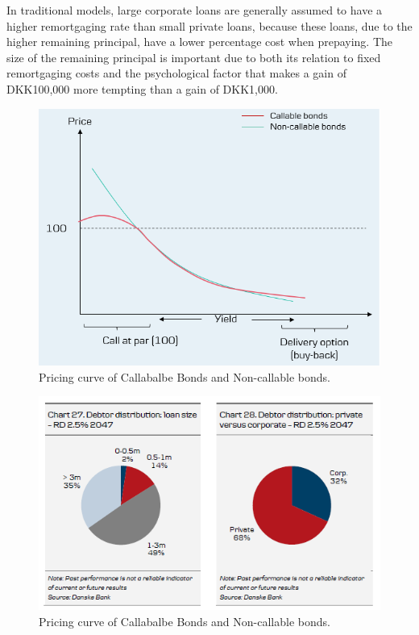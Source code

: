 \documentclass[12pt,twoside]{reedthesis}
\begin{document}
In traditional models, large corporate loans are generally assumed to have a higher remortgaging rate than small private loans, because these loans, due to the higher remaining principal, have a lower percentage cost when prepaying. The size of the remaining principal is important due to both its relation to fixed remortgaging costs and the psychological factor that makes a gain of DKK100,000 more tempting than a gain of DKK1,000.
\begin{figure}

{\centering \includegraphics[width=1\linewidth]{figure/prepay} 

}

\caption{Pricing curve of Callabalbe Bonds and Non-callable bonds.}\label{fig:prepay}
\end{figure}
\begin{figure}

{\centering \includegraphics[width=1\linewidth]{figure/Debtor distribution} 

}

\caption{Pricing curve of Callabalbe Bonds and Non-callable bonds.}\label{fig:debitor}
\end{figure}
\end{document}
